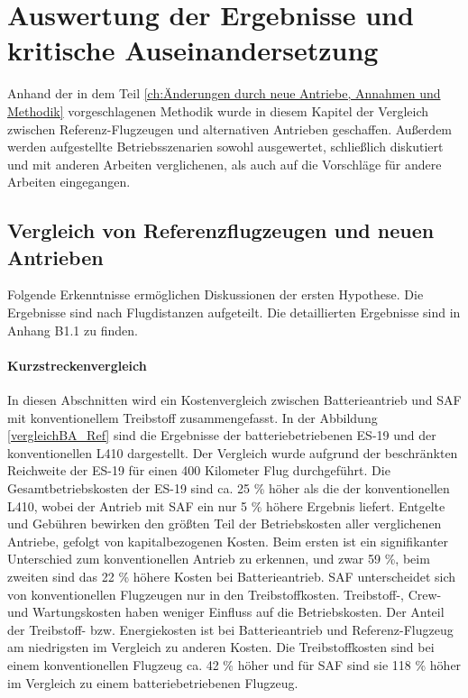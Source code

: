 \chapter{Auswertung der Ergebnisse und kritische Auseinandersetzung}
\label{ch:Auswertung der Ergebnisse}
Anhand der in dem Teil \ref{ch:Änderungen durch neue Antriebe, Annahmen und Methodik} 
vorgeschlagenen Methodik wurde in diesem Kapitel der Vergleich zwischen 
Referenz-Flugzeugen und alternativen Antrieben geschaffen.
Außerdem werden aufgestellte Betriebsszenarien sowohl ausgewertet, 
schließlich diskutiert und mit anderen Arbeiten verglichenen, 
als auch auf die Vorschläge für andere Arbeiten eingegangen.

\section{Vergleich von Referenzflugzeugen und neuen Antrieben}
\label{s:Ergebnisse_Flugzeuge}
Folgende Erkenntnisse ermöglichen Diskussionen der ersten Hypothese. 
Die Ergebnisse sind nach Flugdistanzen aufgeteilt. Die detaillierten Ergebnisse sind in Anhang B1.1 zu finden.\\
%
\subsubsection{Kurzstreckenvergleich}
%
In diesen Abschnitten wird ein Kostenvergleich zwischen Batterieantrieb 
und SAF mit konventionellem Treibstoff zusammengefasst.
In der Abbildung \ref{vergleichBA_Ref} sind die Ergebnisse der 
batteriebetriebenen ES-19 und der konventionellen L410 dargestellt.
Der Vergleich wurde aufgrund der beschränkten Reichweite der ES-19 für einen 400 Kilometer Flug durchgeführt.
%
Die Gesamtbetriebskosten der ES-19 sind ca. 25 \% höher als die der konventionellen L410, 
wobei der Antrieb mit SAF ein nur 5 \% höhere Ergebnis liefert. 
Entgelte und Gebühren bewirken den größten Teil der Betriebskosten aller verglichenen Antriebe, 
gefolgt von kapitalbezogenen Kosten. 
Beim ersten ist ein signifikanter Unterschied zum konventionellen Antrieb zu erkennen, 
und zwar 59 \%, beim zweiten sind das 22 \% höhere Kosten bei Batterieantrieb. 
%
SAF unterscheidet sich von konventionellen Flugzeugen nur in den Treibstoffkosten.
Treibstoff-, Crew- und Wartungskosten haben weniger Einfluss auf die Betriebskosten.
Der Anteil der Treibstoff- bzw. Energiekosten ist bei Batterieantrieb und Referenz-Flugzeug 
am niedrigsten im Vergleich zu anderen Kosten. 
Die Treibstoffkosten sind bei einem konventionellen Flugzeug ca. 42 \% höher und für SAF sind sie 118 \% höher
im Vergleich zu einem batteriebetriebenen Flugzeug. 

